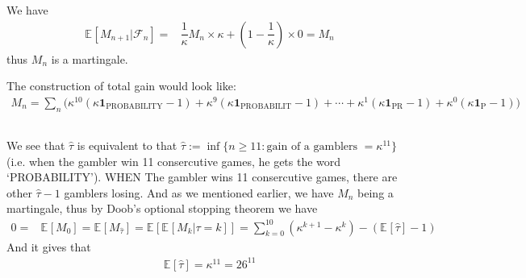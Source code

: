 \documentclass[11pt,a4paper]{ctexart}
\numberwithin{equation}{section}%
\newcommand{\F}{\mathcal{F}}
\begin{document}
We have
\begin{align*}
    \mathbb{E}_{  }\left[ M_{n+1}|\F_n \right] =& \dfrac{ 1 }{ \kappa  }M_n\times \kappa +(1-\dfrac{ 1 }{ \kappa  } )\times 0 = M_n  
\end{align*}
thus $ M_n $ is a martingale.

The construction of total gain would look like:
\begin{align*}
    M_n = \sum_{n} \big( \kappa ^{10}(\kappa \mathbf{1}_\mathrm{ PROBABILITY } -1 ) + \kappa ^{9}( \kappa \mathbf{1}_\mathrm{ PROBABILIT } -1 ) + \cdots + \kappa ^{1}( \kappa \mathbf{1}_\mathrm{ PR } -1 ) + \kappa ^{0}( \kappa \mathbf{1}_\mathrm{ P } -1 ) \big)
\end{align*}



\subsection{}


We see that $ \hat{\tau} $ is equivalent to that $ \hat{\tau}:=\inf\{n\geq 11: \text{gain of a gamblers } = \kappa ^{11}\} $ (i.e. when the gambler win 11 consercutive games, he gets the word `PROBABILITY'). WHEN The gambler wins 11 consercutive games, there are other $ \hat{\tau}-1 $ gamblers losing. And as we mentioned earlier, we have $ M_n $ being a martingale, thus by Doob's optional stopping theorem we have
\begin{align*}
    0=&\mathbb{E}_{  }\left[ M_0 \right] = \mathbb{E}_{  }\left[ M_{\hat{\tau}} \right] = \mathbb{E}_{  }\left[ \mathbb{E}_{  }\left[ M_{k}| \tau=k \right]  \right]= \sum_{k=0}^{10}(\kappa ^{k+1}-\kappa ^k) - ( \mathbb{E}_{  }\left[ \hat{\tau} \right] -1 )
\end{align*}
And it gives that
\begin{align*}
    \mathbb{E}_{  }\left[ \hat{\tau} \right] = \kappa ^{11}=26^{11}
\end{align*}
\end{document}
